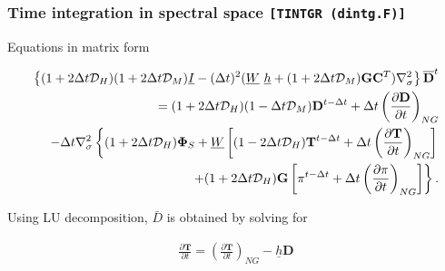 \hypertarget{time-integration-in-spectral-space-tintgr-dintg.f}{%
\subsubsection{\texorpdfstring{Time integration in spectral space
\texttt{{[}TINTGR\ (dintg.F){]}}}{Time integration in spectral space {[}TINTGR (dintg.F){]}}}\label{time-integration-in-spectral-space-tintgr-dintg.f}}

Equations in matrix form

\begin{eqnarray}
      \left\{ ( 1+2\Delta t {\mathcal D}_H )( 1+2\Delta t {\mathcal D}_M )
           \underline{I}  
      - ( \Delta t )^{2}  ( \underline{W} \ \underline{h}
           + (1+2\Delta t {\mathcal D}_M)
             {\mathbf{G}} {\mathbf{C}}^{T} ) \nabla^{2}_{\sigma}
  \right\}
      \overline{ {\mathbf{D}} }^{t}
       \\
  = ( 1+2\Delta t {\mathcal D}_H )( 1-\Delta t {\mathcal D}_M )
       {\mathbf{D}}^{t-\Delta t}
  +\Delta t
         \left( \frac{\partial {\mathbf{D}}}{\partial t} \right)_{NG}  
  \\
  -\Delta t \nabla^{2}_{\sigma}     
                   \left\{  ( 1+2\Delta t {\mathcal D}_H ) {\mathbf{\Phi}}_{S}
                          + \underline{W}
                            \left[ ( 1-2\Delta t {\mathcal D}_H )
                                    {\mathbf{T}}^{t-\Delta t}
                                  + \Delta t
                                      \left( \frac{\partial {\mathbf{T}}}
                                                  {\partial t}     
                                      \right)_{NG} \right]
                   \right.
  \\
                 \left.  \hspace*{20mm}
                          + ( 1+2\Delta t {\mathcal D}_H ) {\mathbf{G}}
                            \left[ \pi^{t-\Delta t}
                                  + \Delta t
                                     \left( \frac{\partial \pi}
                                                 {\partial t}
                                     \right)_{NG}  \right]
                   \right\} .
\end{eqnarray}

Using LU decomposition, \(\bar{D}\) is obtained by solving for

\begin{eqnarray}
  \frac{\partial {\mathbf{T}}}{\partial t}
      =   \left( \frac{\partial {\mathbf{T}}}
                        {\partial t}       \right)_{NG}  
         - \underline{h} {\mathbf{D}}
\end{eqnarray}

